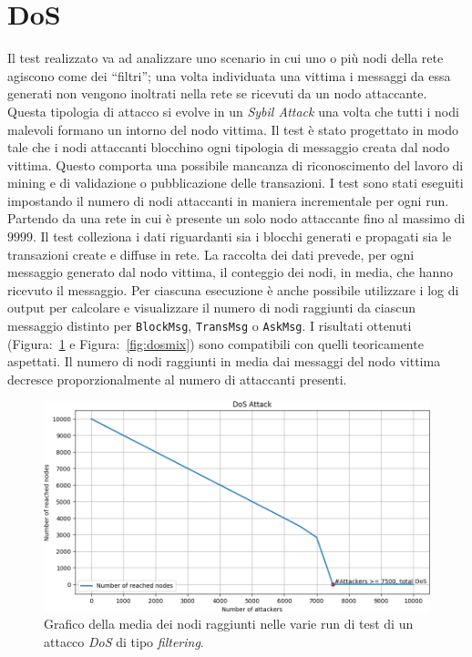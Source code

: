 \section{DoS}
Il test realizzato va ad analizzare uno scenario in cui uno o più nodi della rete agiscono come dei ``filtri''; una volta individuata una vittima i messaggi da essa generati non vengono inoltrati nella rete se ricevuti da un nodo attaccante.\newline
Questa tipologia di attacco si evolve in un \textit{Sybil Attack} una volta che tutti i nodi malevoli formano un intorno del nodo vittima.\newline
Il test è stato progettato in modo tale che i nodi attaccanti blocchino ogni tipologia di messaggio creata dal nodo vittima. Questo comporta una possibile mancanza di riconoscimento del lavoro di mining e di validazione o pubblicazione delle transazioni.\newline
I test sono stati eseguiti impostando il numero di nodi attaccanti in maniera incrementale per ogni run. Partendo da una rete in cui è presente un solo nodo attaccante fino al massimo di $9999$. Il test colleziona i dati riguardanti sia i blocchi generati e propagati sia le transazioni create e diffuse in rete.\newline
La raccolta dei dati prevede, per ogni messaggio generato dal nodo vittima, il conteggio dei nodi, in media, che hanno ricevuto il messaggio. Per ciascuna esecuzione è anche possibile utilizzare i log di output per calcolare e visualizzare il numero di nodi raggiunti da ciascun messaggio distinto per \texttt{BlockMsg}, \texttt{TransMsg} o \texttt{AskMsg}.\newline
I risultati ottenuti (Figura:~\ref{fig:dos} e Figura:~\ref{fig:dosmix}) sono compatibili con quelli teoricamente aspettati. Il numero di nodi raggiunti in media dai messaggi del nodo vittima decresce proporzionalmente al numero di attaccanti presenti.\newline
\begin{figure}
    \centering
    \includegraphics[width=\textwidth]{./images/attackDOS.png}
    \caption{Grafico della media dei nodi raggiunti nelle varie run di test di un attacco \textit{DoS} di tipo \textit{filtering}.}
    \label{fig:dos}
\end{figure}
